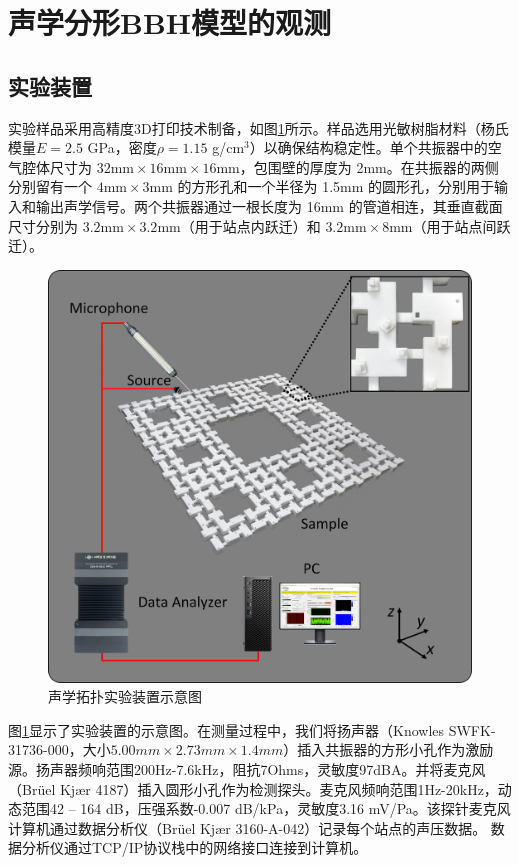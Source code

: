 \section{声学分形BBH模型的观测}
\subsection{实验装置}
\label{sec:experimental_setup}
实验样品采用高精度3D打印技术制备，如图\ref{fig:ExperimentalSetup}所示。样品选用光敏树脂材料（杨氏模量$E=2.5$ GPa，密度$\rho=1.15$ g/cm$^3$）以确保结构稳定性。单个共振器中的空气腔体尺寸为 \( 32 \text{mm} \times 16 \text{mm} \times 16 \text{mm} \)，包围壁的厚度为 2mm。在共振器的两侧分别留有一个 \( 4 \text{mm} \times 3 \text{mm} \) 的方形孔和一个半径为 1.5mm 的圆形孔，分别用于输入和输出声学信号。两个共振器通过一根长度为 16mm 的管道相连，其垂直截面尺寸分别为 \( 3.2 \text{mm} \times 3.2 \text{mm} \)（用于站点内跃迁）和 \( 3.2 \text{mm} \times 8 \text{mm} \)（用于站点间跃迁）。

\begin{figure}[htbp]
    \centering
    \includegraphics[width=0.5\linewidth]{figure/HOTIExp/ExperimentalSetup.png}
    \caption{声学拓扑实验装置示意图}
    \label{fig:ExperimentalSetup}
\end{figure}

图\ref{fig:ExperimentalSetup}显示了实验装置的示意图。在测量过程中，我们将扬声器（Knowles SWFK-31736-000，大小$5.00mm \times 2.73mm \times 1.4mm$）插入共振器的方形小孔作为激励源。扬声器频响范围200Hz-7.6kHz，阻抗7Ohms，灵敏度97dBA。并将麦克风（Brüel Kjær 4187）插入圆形小孔作为检测探头。麦克风频响范围1Hz-20kHz，动态范围42 – 164 dB，压强系数-0.007 dB/kPa，灵敏度3.16 mV/Pa。该探针麦克风计算机通过数据分析仪（Brüel Kjær 3160-A-042）记录每个站点的声压数据。 数据分析仪通过TCP/IP协议栈中的网络接口连接到计算机。
